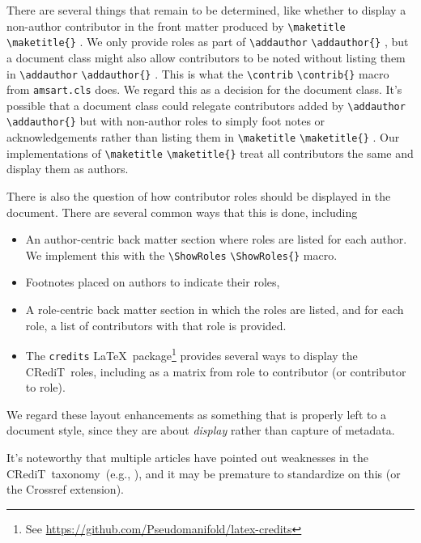 \documentclass{article}
\newcommand\CREDIT{CRediT}
\newcommand{\cmd}[2][]{%
  \def\FirstArg{#1}%
  \ifx\FirstArg\empty%
    \texttt{\textbackslash{}#2}%
  \else%
    \texttt{\textbackslash{}#2\{#1\}}%
  \fi
}
\newcommand{\pkg}[1]{\texttt{#1}}
\begin{document}
\begin{description}
There are several things that remain to be determined, like whether to
display a non-author contributor in the front matter produced
by \cmd{maketitle}.  We only provide roles as part of \cmd{addauthor},
but a document class might also allow contributors to
be noted without listing them in \cmd{addauthor}.  This is what
the \cmd{contrib} macro from \pkg{amsart.cls} does.  We regard this as
a decision for the document class. It's possible that a document class
could relegate contributors added by \cmd{addauthor} but with
non-author roles to simply foot notes or acknowledgements rather than
listing them in \cmd{maketitle}.  Our implementations
of \cmd{maketitle} treat all contributors the same and display them as
authors.

There is also the question of how contributor roles should be displayed
in the document. There are several common ways that this is done, including
\begin{itemize}
\item An author-centric back matter section where roles are listed for each author.
We implement this with the \cmd{ShowRoles} macro.
\item Footnotes placed on authors to indicate their roles,
\item A role-centric back matter section in which the roles are listed, and for each
role, a list of contributors with that role is provided.
\item The \pkg{credits} \LaTeX\
package\footnote{See \url{https://github.com/Pseudomanifold/latex-credits}}
provides several ways to display the \CREDIT\ roles, including as a
matrix from role to contributor (or contributor to
role).
\end{itemize}
We regard these layout enhancements as something that is properly left
to a document style, since they are about \textit{display} rather than
capture of metadata.

It's noteworthy that multiple articles have pointed out weaknesses in
the \CREDIT\ taxonomy~(e.g., \cite{Godskesen19052026}), and it may be
premature to standardize on this (or the Crossref extension).


\end{description}
\end{document}

